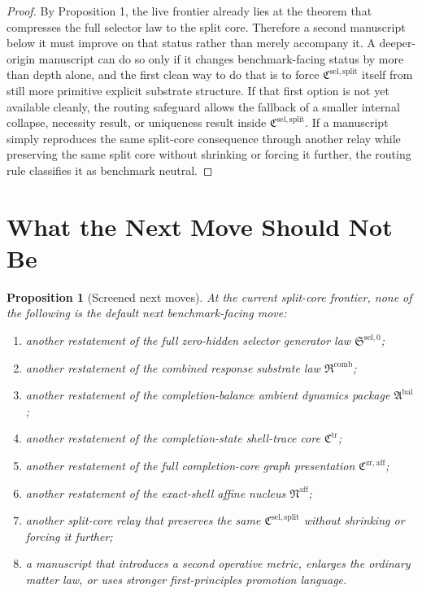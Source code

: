 \documentclass[11pt]{article}
\newcommand{\CompletionCore}{\mathfrak C^{\mathrm{zr,aff}}}
\newcommand{\TraceCore}{\mathfrak C^{\mathrm{tr}}}
\newcommand{\AffineNucleus}{\mathfrak N^{\mathrm{aff}}}
\newcommand{\AmbientPackage}{\mathfrak A^{\mathrm{bal}}}
\newcommand{\CombinedLaw}{\mathfrak R^{\mathrm{comb}}}
\newcommand{\SelectorLaw}{\mathfrak S^{\mathrm{sel},0}}
\newcommand{\SelectorCore}{\mathfrak C^{\mathrm{sel,split}}}
\newtheorem{proposition}{Proposition}
\begin{document}
\begin{proof}
By Proposition 1, the live frontier already lies at the theorem that compresses the full selector law to the split core. Therefore a second manuscript below it must improve on that status rather than merely accompany it. A deeper-origin manuscript can do so only if it changes benchmark-facing status by more than depth alone, and the first clean way to do that is to force \(\SelectorCore\) itself from still more primitive explicit substrate structure. If that first option is not yet available cleanly, the routing safeguard allows the fallback of a smaller internal collapse, necessity result, or uniqueness result inside \(\SelectorCore\). If a manuscript simply reproduces the same split-core consequence through another relay while preserving the same split core without shrinking or forcing it further, the routing rule classifies it as benchmark neutral.
\end{proof}

\section{What the Next Move Should Not Be}

\begin{proposition}[Screened next moves]
At the current split-core frontier, none of the following is the default next benchmark-facing move:
\begin{enumerate}
    \item another restatement of the full zero-hidden selector generator law \(\SelectorLaw\);
    \item another restatement of the combined response substrate law \(\CombinedLaw\);
    \item another restatement of the completion-balance ambient dynamics package \(\AmbientPackage\);
    \item another restatement of the completion-state shell-trace core \(\TraceCore\);
    \item another restatement of the full completion-core graph presentation \(\CompletionCore\);
    \item another restatement of the exact-shell affine nucleus \(\AffineNucleus\);
    \item another split-core relay that preserves the same \(\SelectorCore\) without shrinking or forcing it further;
    \item a manuscript that introduces a second operative metric, enlarges the ordinary matter law, or uses stronger first-principles promotion language.
\end{enumerate}
\end{proposition}
\end{document}
